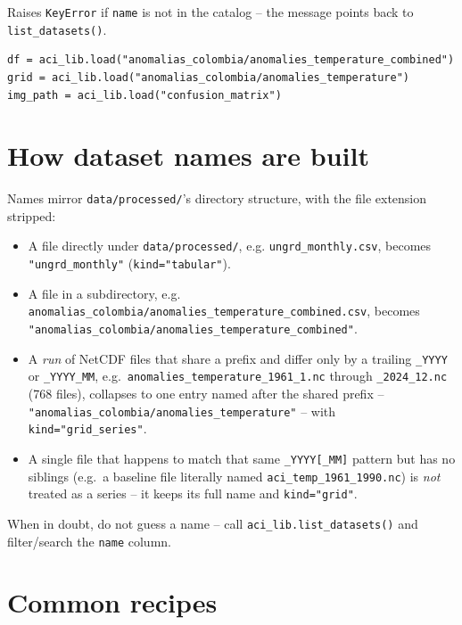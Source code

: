 \documentclass[11pt]{article}
\begin{document}
Raises \texttt{KeyError} if \texttt{name} is not in the catalog -- the
message points back to \texttt{list\_datasets()}.

\begin{lstlisting}
df = aci_lib.load("anomalias_colombia/anomalies_temperature_combined")
grid = aci_lib.load("anomalias_colombia/anomalies_temperature")
img_path = aci_lib.load("confusion_matrix")
\end{lstlisting}

\section{How dataset names are built}
\label{sec:naming}

Names mirror \texttt{data/processed/}'s directory structure, with the file
extension stripped:

\begin{itemize}[leftmargin=*]
\item A file directly under \texttt{data/processed/}, e.g.
  \texttt{ungrd\_monthly.csv}, becomes \texttt{"ungrd\_monthly"}
  (\texttt{kind="tabular"}).
\item A file in a subdirectory, e.g.
  \texttt{anomalias\_colombia/anomalies\_temperature\_combined.csv}, becomes
  \texttt{"anomalias\_colombia/anomalies\_temperature\_combined"}.
\item A \emph{run} of NetCDF files that share a prefix and differ only by a
  trailing \texttt{\_YYYY} or \texttt{\_YYYY\_MM}, e.g.\
  \texttt{anomalies\_temperature\_1961\_1.nc} through
  \texttt{\_2024\_12.nc} (768 files), collapses to one entry named after
  the shared prefix -- \texttt{"anomalias\_colombia/\allowbreak anomalies\_temperature"} --
  with \texttt{kind="grid\_series"}.
\item A single file that happens to match that same \texttt{\_YYYY[\_MM]}
  pattern but has no siblings (e.g.\ a baseline file literally named
  \texttt{aci\_temp\_1961\_1990.nc}) is \emph{not} treated as a series --
  it keeps its full name and \texttt{kind="grid"}.
\end{itemize}

When in doubt, do not guess a name -- call \texttt{aci\_lib.list\_datasets()}
and filter/search the \texttt{name} column.

\section{Common recipes}
\end{document}
